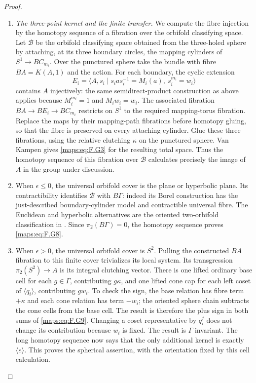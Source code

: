 \begin{proof}
\begin{enumerate}[label={$\langle1\rangle$\arabic*.}]
\item \emph{The three-point kernel and the finite transfer.}
We compute the fibre injection by the homotopy sequence of a
fibration over the orbifold classifying space.  Let $\mathcal B$ be the orbifold classifying
space obtained from the three-holed sphere by attaching, at
its three boundary circles, the mapping cylinders of
$S^1\to BC_{m_i}$.  Over the punctured sphere take the bundle
with fibre $BA=K(A,1)$ and the action.  For each
boundary, the cyclic extension
\[
 E_i=\langle A,s_i\mid s_i a s_i^{-1}=M_i(a),\ s_i^{m_i}=w_i\rangle
\]
contains $A$ injectively: the same semidirect-product construction
as above applies because $M_i^{m_i}=1$ and $M_iw_i=w_i$.
The associated fibration $BA\to BE_i\to BC_{m_i}$ restricts
on $S^1$ to the required mapping-torus fibration.  Replace the
maps by their mapping-path fibrations before homotopy gluing,
so that the fibre is preserved on every attaching cylinder.
Glue these three fibrations, using the relative clutching
$\kappa$ on the punctured sphere.  Van Kampen gives \eqref{maps:eq:F.G3}
for the resulting total space.  Thus the homotopy sequence
of this fibration over $\mathcal B$ calculates precisely
the image of $A$ in the group under discussion.

\item When $\epsilon\le0$, the universal orbifold cover is the plane
or hyperbolic plane.  Its contractibility identifies
$\mathcal B$ with $B\Gamma$: indeed its Borel construction
has the just-described boundary-cylinder model and contractible
universal fibre.  The Euclidean and hyperbolic alternatives
are the oriented two-orbifold classification in
\cite[Theorems 2.3--2.4, p.~425; Euler-characteristic comparison, pp.~427--428]{rootScott83}.
Since $\pi_2(B\Gamma)=0$, the homotopy sequence proves \eqref{maps:eq:F.G8}.

\item When $\epsilon>0$, the universal orbifold cover is $S^2$.
Pulling the constructed $BA$ fibration to this finite cover
trivializes its local system.  Its transgression
$\pi_2(S^2)\to A$ is its integral clutching vector.
There is one lifted ordinary base cell for each $g\in\Gamma$,
contributing $g\kappa$, and one lifted cone cap for each left
coset of $\langle q_i\rangle$, contributing $gw_i$.
To check the sign, the base relation has fibre term $+\kappa$
and each cone relation has term $-w_i$; the oriented sphere
chain subtracts the cone cells from the base cell.  The result
is therefore the plus sign in both sums of \eqref{maps:eq:F.G9}.
Changing a coset representative by $q_i^j$ does not change
its contribution because $w_i$ is fixed.  The result is
$\Gamma$ invariant. The long
homotopy sequence now says that the only additional kernel
is exactly $\langle e\rangle$.  This proves the spherical
assertion, with the orientation fixed by this cell calculation.


\end{enumerate}
\end{proof}
